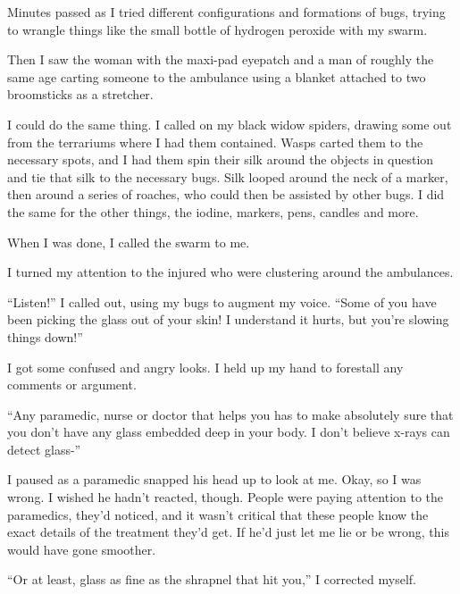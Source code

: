 Minutes passed as I tried different configurations and formations of bugs, trying to wrangle things like the small bottle of hydrogen peroxide with my swarm.



Then I saw the woman with the maxi-pad eyepatch and a man of roughly the same age carting someone to the ambulance using a blanket attached to two broomsticks as a stretcher.



I could do the same thing.  I called on my black widow spiders, drawing some out from the terrariums where I had them contained.  Wasps carted them to the necessary spots, and I had them spin their silk around the objects in question and tie that silk to the necessary bugs.  Silk looped around the neck of a marker, then around a series of roaches, who could then be assisted by other bugs.  I did the same for the other things, the iodine, markers, pens, candles and more.



When I was done, I called the swarm to me.



I turned my attention to the injured who were clustering around the ambulances.



``Listen!'' I called out, using my bugs to augment my voice.  ``Some of you have been picking the glass out of your skin!  I understand it hurts, but you're slowing things down!''



I got some confused and angry looks.  I held up my hand to forestall any comments or argument.



``Any paramedic, nurse or doctor that helps you has to make absolutely sure that you don't have any glass embedded deep in your body.  I don't believe x-rays can detect glass-''



I paused as a paramedic snapped his head up to look at me.  Okay, so I was wrong.  I wished he hadn't reacted, though.  People were paying attention to the paramedics, they'd noticed, and it wasn't critical that these people know the exact details of the treatment they'd get.  If he'd just let me lie or be wrong, this would have gone smoother.



``Or at least, glass as fine as the shrapnel that hit you,'' I corrected myself.



